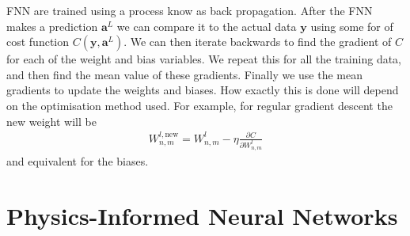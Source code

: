 

FNN are trained using a process know as back propagation. After the FNN makes a prediction $\mathbf{a}^L$ we can compare it to the actual data $\mathbf{y}$ using some for of cost function $C(\mathbf{y}, \mathbf{a}^L)$. We can then iterate backwards to find the gradient of $C$ for each of the weight and bias variables. 
We repeat this for all the training data, and then find the mean value of these gradients.
Finally we use the mean gradients to update the weights and biases. How exactly this is done will depend on the optimisation method used. For example, for regular gradient descent the new weight will be
\begin{align}
	W^{l,\text{new}}_{n,m} = {W^l_{n,m}} - \eta \frac{\partial C}{\partial W^l_{n,m}}
\end{align}
and equivalent for the biases.







\section{Physics-Informed Neural Networks}





